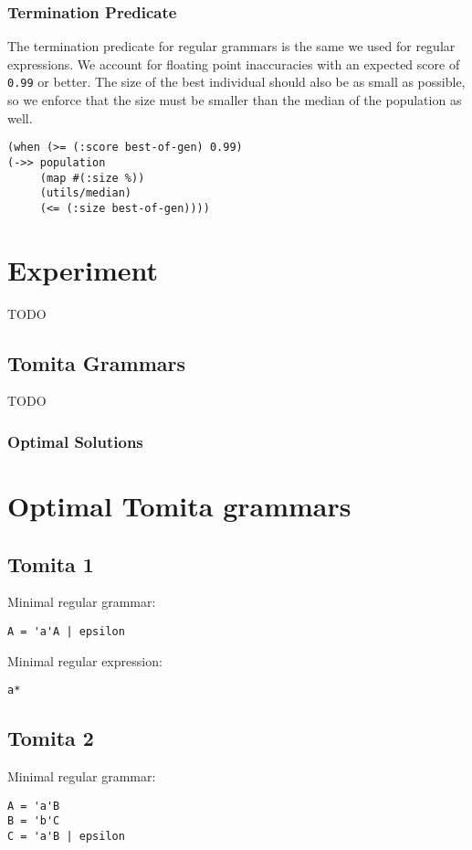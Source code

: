 \documentclass[runningheads]{llncs}
\begin{document}
\subsubsection{Termination Predicate}
The termination predicate for regular grammars is the same we used for regular expressions. We account for floating point inaccuracies with an expected score of \texttt{0.99} or better. The size of the best individual should also be as small as possible, so we enforce that the size must be smaller than the median of the population as well.
\begin{lstlisting}
(when (>= (:score best-of-gen) 0.99)
(->> population
     (map #(:size %))
     (utils/median)
     (<= (:size best-of-gen))))
\end{lstlisting}

\section{Experiment}
TODO

\subsection{Tomita Grammars}
TODO

\subsubsection{Optimal Solutions}
\section{Optimal Tomita grammars}
\label{sec:org13cfadd}
\subsection{Tomita 1}
\label{sec:orge060230}
Minimal regular grammar:
\begin{verbatim}
A = 'a'A | epsilon
\end{verbatim}

Minimal regular expression:
\begin{verbatim}
a*
\end{verbatim}

\subsection{Tomita 2}
\label{sec:orge8776b3}
Minimal regular grammar:
\begin{verbatim}
A = 'a'B
B = 'b'C
C = 'a'B | epsilon
\end{verbatim}
\end{document}

